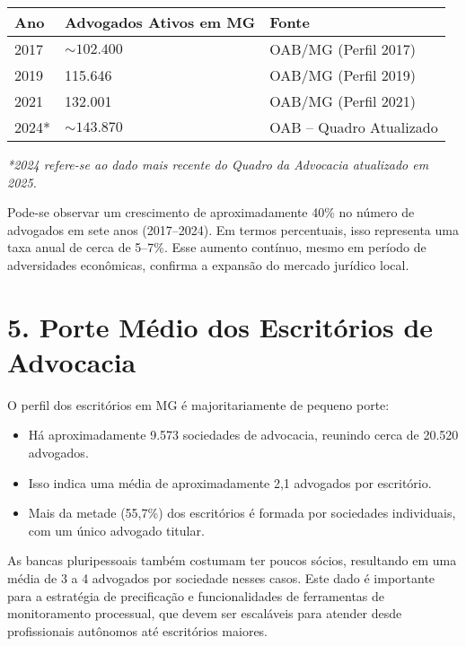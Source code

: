 \documentclass{article}
\begin{document}
\begin{center}
\begin{tabular}{l l l}
\toprule
\textbf{Ano} & \textbf{Advogados Ativos em MG} & \textbf{Fonte} \\
\midrule
2017 & \(\sim 102.400\) & OAB/MG (Perfil 2017) \\
2019 & 115.646 & OAB/MG (Perfil 2019) \\
2021 & 132.001 & OAB/MG (Perfil 2021) \\
2024* & \(\sim 143.870\) & OAB -- Quadro Atualizado \\
\bottomrule
\end{tabular}
\end{center}

\emph{*2024 refere-se ao dado mais recente do Quadro da Advocacia atualizado em 2025.}

Pode-se observar um crescimento de aproximadamente 40\% no número de advogados em sete anos (2017--2024). Em termos percentuais, isso representa uma taxa anual de cerca de 5--7\%. Esse aumento contínuo, mesmo em período de adversidades econômicas, confirma a expansão do mercado jurídico local.

\section{5. Porte Médio dos Escritórios de Advocacia}
O perfil dos escritórios em MG é majoritariamente de pequeno porte:
\begin{itemize}
\item Há aproximadamente 9.573 sociedades de advocacia, reunindo cerca de 20.520 advogados.
\item Isso indica uma média de aproximadamente 2,1 advogados por escritório.
\item Mais da metade (55,7\%) dos escritórios é formada por sociedades individuais, com um único advogado titular.
\end{itemize}

As bancas pluripessoais também costumam ter poucos sócios, resultando em uma média de 3 a 4 advogados por sociedade nesses casos. Este dado é importante para a estratégia de precificação e funcionalidades de ferramentas de monitoramento processual, que devem ser escaláveis para atender desde profissionais autônomos até escritórios maiores.
\end{document}
